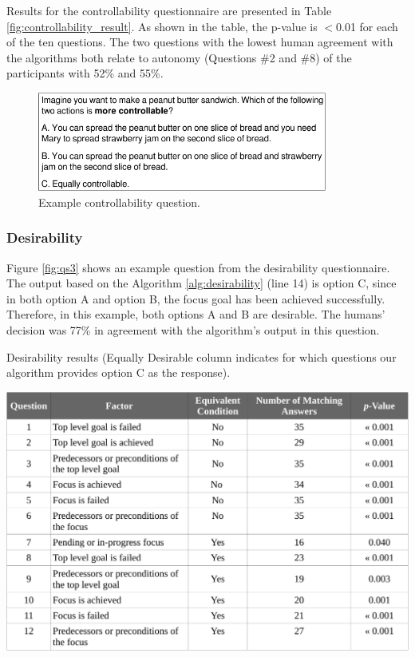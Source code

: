 \documentclass[12pt]{report}
\begin{document}
Results for the controllability questionnaire are presented in Table
\ref{fig:controllability_result}. As shown in the table, the p-value is $<$0.01
for each of the ten questions. The two questions with the lowest human agreement
with the algorithms both relate to autonomy (Questions \#2 and \#8) of the
participants with 52\% and 55\%.

\begin{figure}[tbh]
  \centering
  \includegraphics[width=0.85\textwidth]{figure/question-sample2-croped.pdf}
  \caption{{Example controllability question.}}
  \label{fig:qs2}
\end{figure}

\subsubsection{Desirability}
\label{sec:desirability-crowdsourcing}
Figure \ref{fig:qs3} shows an example question from the desirability
questionnaire. The output based on the Algorithm \ref{alg:desirability}
(line 14) is option C, since in both option A and option B, the focus goal
has been achieved successfully. Therefore, in this example, both options A and B
are desirable. The humans' decision was 77\% in agreement with the algorithm's
output in this question.

\begin{table}[tbh]
  \centering
  \caption{Desirability results {\color{red}(Equally Desirable column indicates
  for which questions our algorithm provides option C as the response)}.}
  \label{fig:desirability_result}
  \vspace*{-3mm}
  \includegraphics[width=1\textwidth]{figure/desirability_result_croped.pdf}
\end{table}
\end{document}
